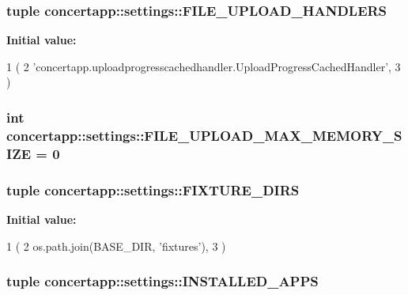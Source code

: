 \label{namespaceconcertapp_1_1settings_ab4129cc2479cee53fcb11d0048c3572e}
\hypertarget{namespaceconcertapp_1_1settings_a3b26ebbff949231f8ca6960b192e273a}{
\subsubsection[{FILE\_\-UPLOAD\_\-HANDLERS}]{\setlength{\rightskip}{0pt plus 5cm}tuple {\bf concertapp::settings::FILE\_\-UPLOAD\_\-HANDLERS}}}
\label{namespaceconcertapp_1_1settings_a3b26ebbff949231f8ca6960b192e273a}
{\bfseries Initial value:}
\begin{DoxyCode}
1 (
2     'concertapp.uploadprogresscachedhandler.UploadProgressCachedHandler', 
3 )
\end{DoxyCode}
\hypertarget{namespaceconcertapp_1_1settings_a950119dc16c0336705f6aac5b0f60063}{
\subsubsection[{FILE\_\-UPLOAD\_\-MAX\_\-MEMORY\_\-SIZE}]{\setlength{\rightskip}{0pt plus 5cm}int {\bf concertapp::settings::FILE\_\-UPLOAD\_\-MAX\_\-MEMORY\_\-SIZE} = 0}}
\label{namespaceconcertapp_1_1settings_a950119dc16c0336705f6aac5b0f60063}
\hypertarget{namespaceconcertapp_1_1settings_a25f62ec41c28b4b6a4f5b8e471c7b062}{
\subsubsection[{FIXTURE\_\-DIRS}]{\setlength{\rightskip}{0pt plus 5cm}tuple {\bf concertapp::settings::FIXTURE\_\-DIRS}}}
\label{namespaceconcertapp_1_1settings_a25f62ec41c28b4b6a4f5b8e471c7b062}
{\bfseries Initial value:}
\begin{DoxyCode}
1 (
2     os.path.join(BASE_DIR, 'fixtures'),
3 )
\end{DoxyCode}
\hypertarget{namespaceconcertapp_1_1settings_ac6706d774882b41555116e1e4f878125}{
\subsubsection[{INSTALLED\_\-APPS}]{\setlength{\rightskip}{0pt plus 5cm}tuple {\bf concertapp::settings::INSTALLED\_\-APPS}}}
